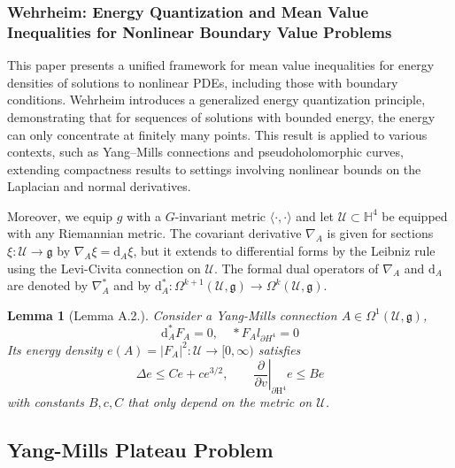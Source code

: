 \documentclass[10pt, letterpaper]{article}
\theoremstyle{custom}
\newtheorem{lemma}[theorem]{Lemma}
\theoremstyle{definition}
\begin{document}
\subsubsection{Wehrheim: Energy Quantization and Mean Value Inequalities for Nonlinear Boundary Value Problems \cite{wehrheim2005energy}} 
This paper presents a unified framework for mean value inequalities for energy densities of solutions to nonlinear PDEs, including those with boundary conditions. Wehrheim introduces a generalized energy quantization principle, demonstrating that for sequences of solutions with bounded energy, the energy can only concentrate at finitely many points. This result is applied to various contexts, such as Yang–Mills connections and pseudoholomorphic curves, extending compactness results to settings involving nonlinear bounds on the Laplacian and normal derivatives.

{\small
Moreover, we equip $g$ with a $G$-invariant metric $\langle\cdot, \cdot\rangle$ and let $\mathcal{U}\subset \mathbb{H}^4$ be equipped with any Riemannian metric. The covariant derivative $\nabla_A$ is given for sections $\xi: \mathcal{U} \rightarrow \mathfrak{g}$ by $\nabla_A \xi=\mathrm{d}_A \xi$, but it extends to differential forms by the Leibniz rule using the Levi-Civita connection on $\mathcal{U}$. The formal dual operators of $\nabla_A$ and $\mathrm{d}_A$ are denoted by $\nabla_A^*$ and by $\mathrm{d}_A^*: \Omega^{k+1}(\mathcal{U}, \mathfrak{g}) \rightarrow \Omega^k(\mathcal{U}, \mathfrak{g})$.

\begin{lemma}[Lemma A.2.]
Consider a Yang-Mills connection $A \in \Omega^1(\mathcal{U}, \mathfrak{g})$,
$$
\mathrm{d}_A^* F_A=0, \quad * F_A l_{\partial H^4}=0
$$
Its energy density $e(A)=\left|F_A\right|^2: \mathcal{U} \rightarrow[0, \infty)$ satisfies
$$
\Delta e \leq C e+c e^{3 / 2},\left.\quad \quad \frac{\partial}{\partial v}\right|_{\partial \mathrm{H}^4} e \leq B e
$$
with constants $B, c, C$ that only depend on the metric on $\mathcal{U}$.
\end{lemma} 
}

\vspace{1cm}

\subsection{Yang-Mills Plateau Problem}
\end{document}
